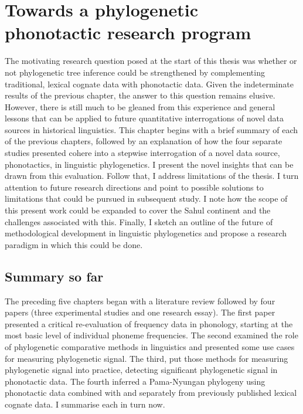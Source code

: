 \chapter[Towards phylogenetic phonotactics]{Towards a phylogenetic phonotactic research program}
\label{ch-discussion}

The motivating research question posed at the start of this thesis was whether or not phylogenetic tree inference could be strengthened by complementing traditional, lexical cognate data with phonotactic data. Given the indeterminate results of the previous chapter, the answer to this question remains elusive. However, there is still much to be gleaned from this experience and general lessons that can be applied to future quantitative interrogations of novel data sources in historical linguistics. This chapter begins with a brief summary of each of the previous chapters, followed by an explanation of how the four separate studies presented cohere into a stepwise interrogation of a novel data source, phonotactics, in linguistic phylogenetics. I present the novel insights that can be drawn from this evaluation. Follow that, I address limitations of the thesis. I turn attention to future research directions and point to possible solutions to limitations that could be pursued in subsequent study. I note how the scope of this present work could be expanded to cover the Sahul continent and the challenges associated with this. Finally, I sketch an outline of the future of methodological development in linguistic phylogenetics and propose a research paradigm in which this could be done.

\hypertarget{discussion-intro}{%
\section{Summary so far}\label{discussion-intro}}

The preceding five chapters began with a literature review followed by four papers (three experimental studies and one research essay). The first paper presented a critical re-evaluation of frequency data in phonology, starting at the most basic level of individual phoneme frequencies. The second examined the role of phylogenetic comparative methods in linguistics and presented some use cases for measuring phylogenetic signal. The third, put those methods for measuring phylogenetic signal into practice, detecting significant phylogenetic signal in phonotactic data. The fourth inferred a Pama-Nyungan phylogeny using phonotactic data combined with and separately from previously published lexical cognate data. I summarise each in turn now.

